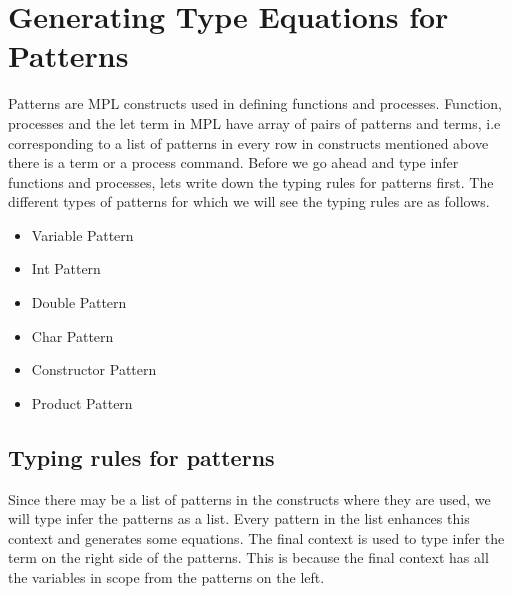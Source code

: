 \documentclass[11pt]{article}
\begin{document}
\section {Generating Type Equations for Patterns}
Patterns are MPL constructs used in defining functions and processes. Function, processes and the let term in MPL have array of pairs of patterns and terms, i.e corresponding to a list of patterns in every row in constructs mentioned above there is a  term or a process command. Before we go ahead and type infer functions and processes, lets write down the typing rules for patterns first.
The different types of patterns for which we will see the typing rules  are as follows.
\begin{itemize}
  \item Variable Pattern
  \item Int Pattern
  \item Double Pattern
  \item Char Pattern
  \item Constructor Pattern
  \item Product Pattern
\end {itemize}

\subsection {Typing rules for patterns}
Since there may be a list of patterns in the constructs where they are used, we will type infer the patterns as a list. Every pattern in the list enhances this context and generates some equations. The final context is used to type infer the term on the right side of the patterns. This is because the final context has all the variables in scope from the patterns on the left.
\end{document}
